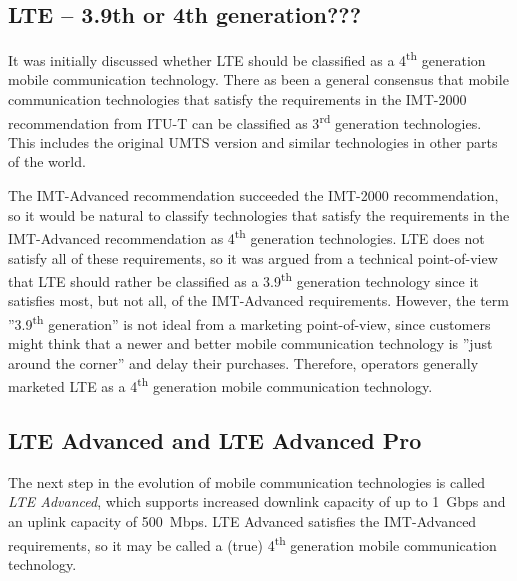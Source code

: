 \subsection{LTE -- 3.9th or 4th generation???}
It was initially discussed whether LTE should be classified as a 4\textsuperscript{th} generation mobile communication technology. There as been a general consensus that mobile communication technologies that satisfy the requirements in the IMT-2000 recommendation from ITU-T can be classified as 3\textsuperscript{rd} generation technologies. This includes the original UMTS version and similar technologies in other parts of the world.

The IMT-Advanced recommendation succeeded the IMT-2000 recommendation, so it would be natural to classify technologies that satisfy the requirements in the IMT-Advanced recommendation as 4\textsuperscript{th} generation technologies. LTE does not satisfy all of these requirements, so it was argued from a technical point-of-view that LTE should rather be classified as a 3.9\textsuperscript{th} generation technology since it satisfies most, but not all, of the IMT-Advanced requirements. However, the term ''3.9\textsuperscript{th} generation'' is not ideal from a marketing point-of-view, since customers might think that a newer and better mobile communication technology is ''just around the corner'' and delay their purchases. Therefore, operators generally marketed LTE as a 4\textsuperscript{th} generation mobile communication technology.

\subsection{LTE Advanced and LTE Advanced Pro}
The next step in the evolution of mobile communication technologies is called \emph{LTE Advanced}, which supports increased downlink capacity of up to 1~Gbps and an uplink capacity of 500~Mbps. LTE Advanced satisfies the IMT-Advanced requirements, so it may be called a (true) 4\textsuperscript{th} generation mobile communication technology.

